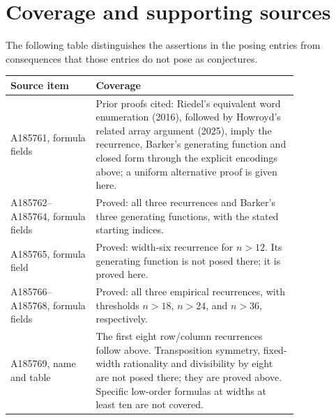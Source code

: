 \documentclass[11pt]{article}
\begin{document}
\section{Coverage and supporting sources}
The following table distinguishes the assertions in the posing entries
from consequences that those entries do not pose as conjectures.
\begin{center}
\begin{tabular}{p{0.24\linewidth}p{0.58\linewidth}}
\toprule
Source item&Coverage\\
\midrule
A185761, formula fields&Prior proofs cited: Riedel's equivalent word
enumeration (2016), followed by Howroyd's related array argument (2025),
imply the recurrence, Barker's generating function and closed form through
the explicit encodings above; a uniform alternative proof is given here.\\
A185762--A185764, formula fields&Proved: all three recurrences and
Barker's three generating functions, with the stated starting indices.\\
A185765, formula field&Proved: width-six recurrence for $n>12$. Its
generating function is not posed there; it is proved here.\\
A185766--A185768, formula fields&Proved: all three empirical recurrences,
with thresholds $n>18$, $n>24$, and $n>36$, respectively.\\
A185769, name and table&The first eight row/column recurrences follow
above. Transposition symmetry, fixed-width rationality and divisibility
by eight are not posed there; they are proved above. Specific low-order
formulas at widths at least ten are not covered.\\
\bottomrule
\end{tabular}
\end{center}
\end{document}
